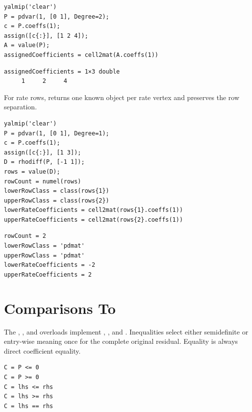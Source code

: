 \examplehead
\begin{lstlisting}[style=dpmatlab]
yalmip('clear')
P = pdvar(1, [0 1], Degree=2);
c = P.coeffs(1);
assign([c{:}], [1 2 4]);
A = value(P);
assignedCoefficients = cell2mat(A.coeffs(1))
\end{lstlisting}

\begin{lstlisting}[style=dpoutput]
assignedCoefficients = 1×3 double
     1     2     4
\end{lstlisting}

For rate rows,  returns one known object per rate vertex and preserves the row separation.

\begin{lstlisting}[style=dpmatlab]
yalmip('clear')
P = pdvar(1, [0 1], Degree=1);
c = P.coeffs(1);
assign([c{:}], [1 3]);
D = rhodiff(P, [-1 1]);
rows = value(D);
rowCount = numel(rows)
lowerRowClass = class(rows{1})
upperRowClass = class(rows{2})
lowerRateCoefficients = cell2mat(rows{1}.coeffs(1))
upperRateCoefficients = cell2mat(rows{2}.coeffs(1))
\end{lstlisting}

\begin{lstlisting}[style=dpoutput]
rowCount = 2
lowerRowClass = 'pdmat'
upperRowClass = 'pdmat'
lowerRateCoefficients = -2
upperRateCoefficients = 2
\end{lstlisting}

\section{Comparisons To \texorpdfstring{}{pdlmi}}
\label{sec:pdvar-comparison}

The , , and  overloads implement \code{<=}, \code{>=}, and \code{==}.  Inequalities select either semidefinite or entry-wise meaning once for the complete original residual. Equality is always direct coefficient equality.

\syntaxhead
\begin{lstlisting}[style=dpsyntax]
C = P <= 0
C = P >= 0
C = lhs <= rhs
C = lhs >= rhs
C = lhs == rhs
\end{lstlisting}

